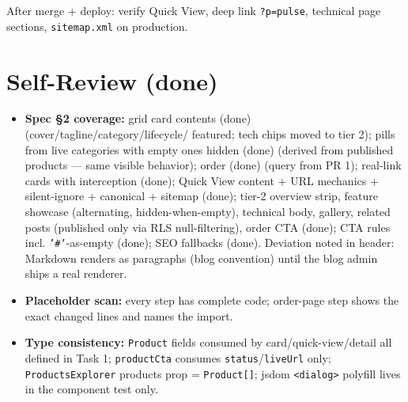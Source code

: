 \documentclass[11pt,a4paper]{article}
\begin{document}
After merge + deploy: verify Quick View, deep link \texttt{?p=pulse}, technical page sections,
\texttt{sitemap.xml} on production.

\section{Self-Review (done)}
\begin{itemize}
  \item \textbf{Spec \S2 coverage:} grid card contents (done) (cover/tagline/category/lifecycle/
        featured; tech chips moved to tier 2); pills from live categories with empty ones hidden
        (done) (derived from published products --- same visible behavior); order (done) (query
        from PR 1); real-link cards with interception (done); Quick View content + URL mechanics +
        silent-ignore + canonical + sitemap (done); tier-2 overview strip, feature showcase
        (alternating, hidden-when-empty), technical body, gallery, related posts (published only
        via RLS null-filtering), order CTA (done); CTA rules incl. \texttt{'\#'}-as-empty (done);
        SEO fallbacks (done). Deviation noted in header: Markdown renders as paragraphs (blog
        convention) until the blog admin ships a real renderer.
  \item \textbf{Placeholder scan:} every step has complete code; order-page step shows the exact
        changed lines and names the import.
  \item \textbf{Type consistency:} \texttt{Product} fields consumed by card/quick-view/detail all
        defined in Task 1; \texttt{productCta} consumes \texttt{status}/\texttt{liveUrl} only;
        \texttt{ProductsExplorer} products prop = \texttt{Product[]}; jsdom \texttt{<dialog>}
        polyfill lives in the component test only.
\end{itemize}
\end{document}
